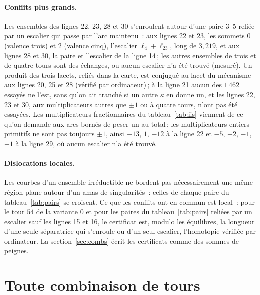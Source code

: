 \documentclass[11pt,a4paper]{article}
\begin{document}
\paragraph{Conflits plus grands.}
Les ensembles des lignes 22, 23, 28 et 30 s'enroulent autour d'une paire
3--5 reliée par un escalier qui passe par l'arc maintenu~: aux lignes 22 et
23, les sommets $0$ (valence trois) et $2$ (valence cinq), l'escalier $\ell_4
+ \ell_{23}$, long de $3,219$, et aux lignes 28 et 30, la paire et l'escalier
de la ligne 14\,; les autres ensembles de trois et de quatre tours sont des
échanges, ou aucun escalier n'a été trouvé (mesuré). Un produit des trois
lacets, reliés dans la carte, est conjugué au lacet du mécanisme aux lignes
20, 25 et 28 (vérifié par ordinateur)\,; à la ligne 21 aucun des $1\,462$
essayés ne l'est, sans qu'on ait tranché si un autre $\kappa$ en donne un, et les lignes 22, 23 et
30, aux multiplicateurs autres que $\pm1$ ou à quatre tours, n'ont pas été
essayées. Les multiplicateurs
fractionnaires du tableau~\ref{tab:iis} viennent de ce qu'on demande aux arcs
bornés de peser un au total\,; les multiplicateurs entiers primitifs ne sont
pas toujours $\pm1$, ainsi $-13$, $1$, $-12$ à la ligne 22 et $-5$, $-2$,
$-1$, $-1$ à la ligne 29, où aucun escalier n'a été trouvé.

\paragraph{Dislocations locales.}
Les courbes d'un ensemble irréductible ne bordent pas nécessairement une même
région plane autour d'un amas de singularités~: celles de chaque paire du
tableau~\ref{tab:pairs} se croisent. Ce que les conflits ont en commun est
local~: pour le tour $54$ de la variante 0 et pour les paires du
tableau~\ref{tab:pairs} reliées par un escalier sauf les lignes 15 et 16, le
certificat est, modulo les équilibres, la longueur d'une seule séparatrice qui
s'enroule ou d'un seul escalier, l'homotopie vérifiée par ordinateur. La
section~\ref{sec:combs} écrit les certificats comme des sommes de peignes.

\section{Toute combinaison de tours}\label{sec:fox}
\end{document}
